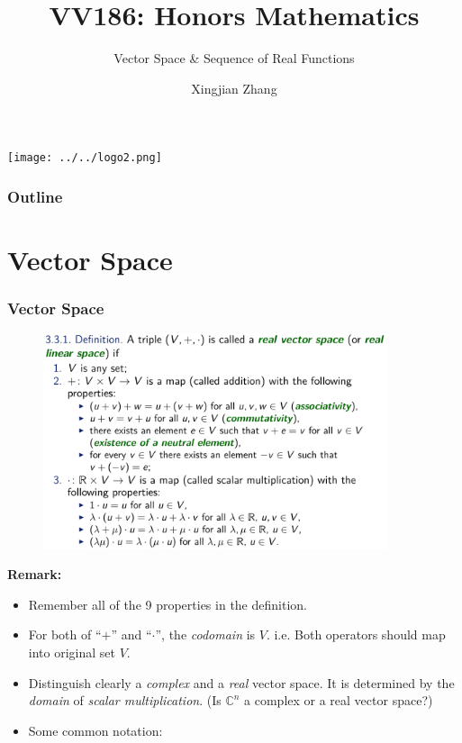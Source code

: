 \documentclass[10pt, t]{beamer}
\title{VV186: Honors Mathematics}
\subtitle{Vector Space \& Sequence of Real Functions}
\institute[UM-SJTU JI]{Univerity of Michigan-Shanghai Jiao Tong University Joint Institute}
\author{Xingjian Zhang}
\renewcommand{\emph}[1]{{\color{themecolor}\textsl{#1}}}
\begin{document}
\begin{frame}
    \titlepage
    \begin{center}
        \texttt{[image: ../../logo2.png]}
    \end{center}
\end{frame}

\begin{frame}
    \frametitle{Outline}
    \begin{spacing}{1}
        \tableofcontents
    \end{spacing}
\end{frame}

\section{Vector Space}
\begin{frame}[allowframebreaks]
    \frametitle{Vector Space}
    \begin{figure}[H]
        \centering
        \includegraphics[width=0.9\textwidth]{2020-11-17-19-48-09.png}
    \end{figure}
    \textbf{Remark:}
    \begin{itemize}
        \item 
        Remember all of the 9 properties in the definition.
        \item For both of ``$+$'' and ``$\cdot$'', the \emph{codomain} is $V$. i.e. Both operators should map into original set $V$.
        \item Distinguish clearly a \emph{complex} and a \emph{real} vector space. It is determined by the \emph{domain} of \emph{scalar multiplication}. (Is $\mathbb{C}^n$ a complex or a real vector space?) 
        \item Some common notation:\begin{enumerate}

\end{enumerate}
\end{itemize}
\end{frame}
\end{document}
